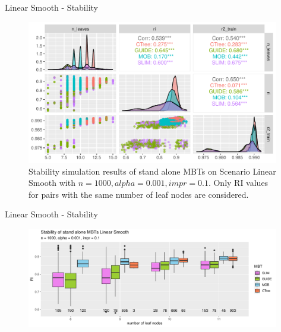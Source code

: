 \documentclass[9pt, xcolor=table]{beamer}
\begin{document}
\begin{frame}{Linear Smooth - Stability}
\begin{figure}
\caption{Stability simulation results of stand alone MBTs on Scenario Linear Smooth with $n = 1000, alpha = 0.001, impr = 0.1$. Only RI values for pairs with the same number of leaf nodes are considered.}
    \includegraphics[width=11cm]{Figures/simulations/batchtools/basic_scenarios/linear_smooth/ls_1000_standalone_overview.pdf}
\end{figure}  
    
\end{frame}

\begin{frame}{Linear Smooth - Stability}
\begin{figure}
    \includegraphics[width=11cm]{Figures/simulations/batchtools/basic_scenarios/linear_smooth/ls_1000_standalone_sta.pdf}
\end{figure}  
    
\end{frame}
\end{document}
